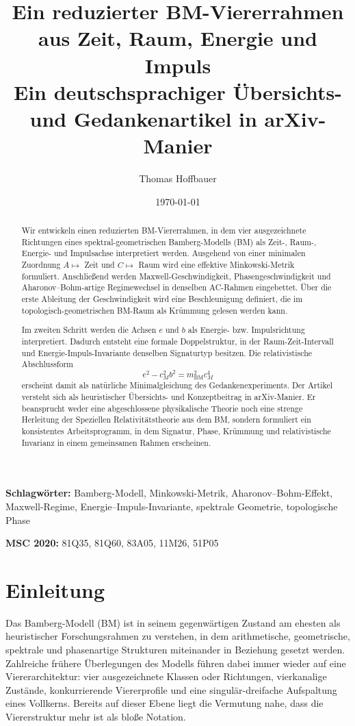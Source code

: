 \documentclass[11pt,a4paper]{article}
\title{Ein reduzierter BM-Viererrahmen aus Zeit, Raum, Energie und Impuls\\
	\large Ein deutschsprachiger Übersichts- und Gedankenartikel in arXiv-Manier}
\author{Thomas Hoffbauer}
\date{\today}
\theoremstyle{definition}
\theoremstyle{plain}
\begin{document}
	\maketitle
	
	\begin{abstract}
		Wir entwickeln einen reduzierten BM-Viererrahmen, in dem vier ausgezeichnete Richtungen eines spektral-geometrischen Bamberg-Modells (BM) als Zeit-, Raum-, Energie- und Impulsachse interpretiert werden. Ausgehend von einer minimalen Zuordnung $A\mapsto$ Zeit und $C\mapsto$ Raum wird eine effektive Minkowski-Metrik formuliert. Anschließend werden Maxwell-Geschwindigkeit, Phasengeschwindigkeit und Aharonov--Bohm-artige Regimewechsel in denselben AC-Rahmen eingebettet. Über die erste Ableitung der Geschwindigkeit wird eine Beschleunigung definiert, die im topologisch-geometrischen BM-Raum als Krümmung gelesen werden kann.
		
		Im zweiten Schritt werden die Achsen $e$ und $b$ als Energie- bzw. Impulsrichtung interpretiert. Dadurch entsteht eine formale Doppelstruktur, in der Raum-Zeit-Intervall und Energie-Impuls-Invariante denselben Signaturtyp besitzen. Die relativistische Abschlussform
		\[
		e^2 - c_M^2 b^2 = m_{\mathrm{BM}}^2 c_M^4
		\]
		erscheint damit als natürliche Minimalgleichung des Gedankenexperiments. Der Artikel versteht sich als heuristischer Übersichts- und Konzeptbeitrag in arXiv-Manier. Er beansprucht weder eine abgeschlossene physikalische Theorie noch eine strenge Herleitung der Speziellen Relativitätstheorie aus dem BM, sondern formuliert ein konsistentes Arbeitsprogramm, in dem Signatur, Phase, Krümmung und relativistische Invarianz in einem gemeinsamen Rahmen erscheinen.
	\end{abstract}
	
	\noindent\textbf{Schlagwörter:} Bamberg-Modell, Minkowski-Metrik, Aharonov--Bohm-Effekt, Maxwell-Regime, Energie--Impuls-Invariante, spektrale Geometrie, topologische Phase
	
	\medskip
	\noindent\textbf{MSC 2020:} 81Q35, 81Q60, 83A05, 11M26, 51P05
	
	\tableofcontents
	
	\section{Einleitung}
	
	Das Bamberg-Modell (BM) ist in seinem gegenwärtigen Zustand am ehesten als heuristischer Forschungsrahmen zu verstehen, in dem arithmetische, geometrische, spektrale und phasenartige Strukturen miteinander in Beziehung gesetzt werden. Zahlreiche frühere Überlegungen des Modells führen dabei immer wieder auf eine Viererarchitektur: vier ausgezeichnete Klassen oder Richtungen, vierkanalige Zustände, konkurrierende Viererprofile und eine singulär-dreifache Aufspaltung eines Vollkerns. Bereits auf dieser Ebene liegt die Vermutung nahe, dass die Viererstruktur mehr ist als bloße Notation.
	
\end{document}
